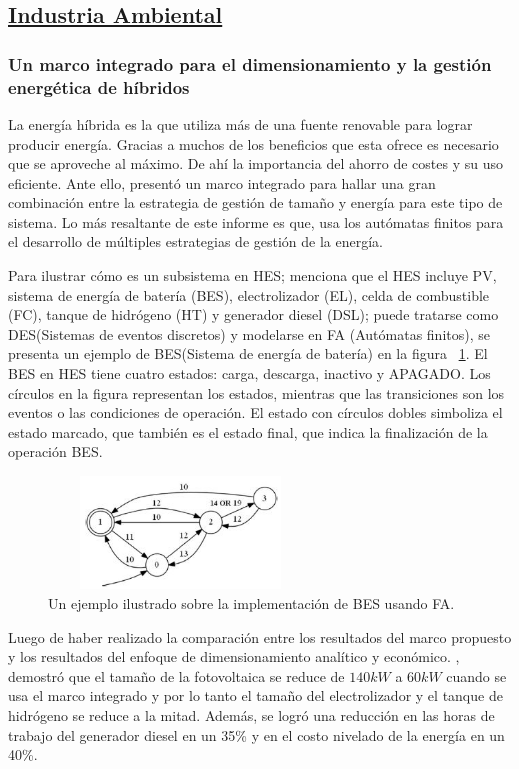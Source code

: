 \documentclass[10pt,conference]{IEEEtran}
\begin{document}
\subsection{\underline{\textbf{Industria Ambiental}}}
\vspace{2mm}
\subsubsection{\textbf{Un marco integrado para el dimensionamiento y la gestión energética de híbridos}}
La energía híbrida es la que utiliza más de una fuente renovable para lograr producir energía. Gracias a muchos de los beneficios que esta ofrece es necesario que se aproveche al máximo. De ahí la importancia del ahorro de costes y su uso eficiente. Ante ello,  presentó un marco integrado para hallar una gran combinación entre la estrategia de gestión de tamaño y energía para este tipo de sistema. Lo más resaltante de este informe es que, usa los autómatas finitos para el desarrollo de múltiples estrategias de gestión de la energía.\par 
Para ilustrar cómo es un subsistema en HES;  menciona que el HES incluye PV, sistema de energía de batería (BES), electrolizador (EL), celda de combustible (FC), tanque de hidrógeno (HT) y generador diesel (DSL); puede tratarse como DES(Sistemas de eventos discretos) y modelarse en FA (Autómatas finitos), se presenta un ejemplo de BES(Sistema de energía de batería) en la figura ~\ref{Amb-1}. El BES en HES tiene cuatro estados: carga, descarga, inactivo y APAGADO. Los círculos en la figura representan los estados, mientras que las transiciones son los eventos o las condiciones de operación. El estado con círculos dobles simboliza el estado marcado, que también es el estado final, que indica la finalización de la operación BES.
\begin{figure}[H]
 \begin{center}
       \includegraphics[width=7cm, height=3cm]{Ind. Ambiental/1.JPG}
      \caption{Un ejemplo ilustrado sobre la implementación de BES usando FA.}
      \label{Amb-1} 
      \end{center}
\end{figure}
Luego de haber realizado la comparación entre los resultados del marco propuesto y los resultados del enfoque de dimensionamiento analítico y económico. , demostró que el tamaño de la fotovoltaica se reduce de $140 kW$ a $60 kW$ cuando se usa el marco integrado y por lo tanto el tamaño del electrolizador y el tanque de hidrógeno se reduce a la mitad. Además, se logró una reducción en las horas de trabajo del generador diesel en un 35\% y en el costo nivelado de la energía en un 40\%.
\vspace{2.5mm}
\end{document}
